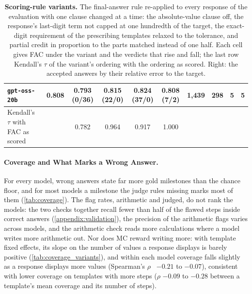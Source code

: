 \begin{table}[t]
{\begin{tabular}{l r c c c c r r r r}
\texttt{gpt-oss-20b} & 0.808 & 0.793 (0/36) & 0.815 (22/0) & 0.824 (37/0) & 0.808 (7/2) & 1,439 & 298 & 5 & 5 \\
\midrule
Kendall's $\tau$ with FAC as scored & & 0.782 & 0.964 & 0.917 & 1.000 & & & & \\
\bottomrule
\end{tabular}
}
\caption{\textbf{Scoring-rule variants.} The final-answer rule re-applied to every response of the
evaluation with one clause changed at a time: the absolute-value clause off, the response's
last-digit term not capped at one hundredth of the target, the exact-digit requirement of the
prescribing templates relaxed to the tolerance, and partial credit in proportion to the parts
matched instead of one half. Each cell gives FAC under the variant and the verdicts that rise and
fall; the last row Kendall's $\tau$ of the variant's ordering with the ordering as scored. Right:
the accepted answers by their relative error to the target.}
\label{tab:scoring_variants}
\end{table}

\paragraph{Coverage and What Marks a Wrong Answer.} For every model, wrong answers state far more
gold milestones than the chance floor, and for most models a milestone the judge rules missing marks
most of them (\autoref{tab:coverage}).
The flag rates, arithmetic and judged, do not rank the models: the two checks together recall fewer
than half of the flawed steps inside correct answers (\autoref{appendix:validation}), the precision
of the arithmetic flags varies across models, and the arithmetic check reads more calculations where
a model writes more arithmetic out.
Nor does MC reward writing more: with template fixed effects, its slope on the number of values a
response displays is barely positive (\autoref{tab:coverage_variants}), and within each model
coverage falls slightly as a response displays more values (Spearman's
$\rho$~\citep{spearman1904} $-0.21$ to $-0.07$), consistent with lower coverage on templates with
more steps ($\rho$ $-0.09$ to $-0.28$ between a template's mean coverage and its number of steps).

